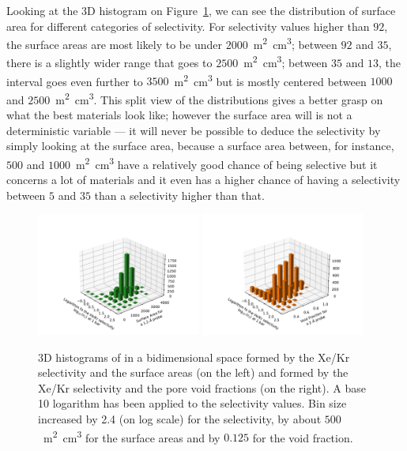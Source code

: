\documentclass[main.tex]{subfiles}
\begin{document}
Looking at the 3D histogram on Figure~\ref{fgr:3D_hist_sa_vol}, we can see the distribution of surface area for different categories of selectivity. For selectivity values higher than $92$, the surface areas are most likely to be under $2000$~\si{\square\meter\cubic\centi\meter}; between $92$ and $35$, there is a slightly wider range that goes to $2500$~\si{\square\meter\cubic\centi\meter}; between $35$ and $13$, the interval goes even further to $3500$~\si{\square\meter\cubic\centi\meter} but is mostly centered between $1000$ and $2500$~\si{\square\meter\cubic\centi\meter}. This split view of the distributions gives a better grasp on what the best materials look like; however the surface area will is not a deterministic variable --- it will never be possible to deduce the selectivity by simply looking at the surface area, because a surface area between, for instance, $500$ and $1000$~\si{\square\meter\cubic\centi\meter} have a relatively good chance of being selective but it concerns a lot of materials and it even has a higher chance of having a selectivity between $5$ and $35$ than a selectivity higher than that. 

\begin{figure}[ht!]
  \centering
  \includegraphics[width=0.48\textwidth,trim={2cm 0 2cm 2cm},clip]{figures/2-thermo/3D_hist_selec_SA.pdf}
  \includegraphics[width=0.48\textwidth,trim={2cm 0 2cm 2cm},clip]{figures/2-thermo/3D_hist_selec_vol.pdf}
  \caption{3D histograms of in a bidimensional space formed by the Xe/Kr selectivity and the surface areas (on the left) and formed by the Xe/Kr selectivity and the pore void fractions (on the right). A base 10 logarithm has been applied to the selectivity values. Bin size increased by 2.4 (on log scale) for the selectivity, by about $500$~\si{\square\meter\cubic\centi\meter} for the surface areas and by $0.125$ for the void fraction. }\label{fgr:3D_hist_sa_vol}
\end{figure}
\end{document}

